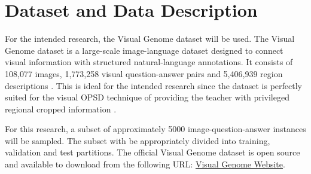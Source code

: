 \section{Dataset and Data Description}

For the intended research, the Visual Genome dataset will be used. The Visual Genome
dataset is a large-scale image-language dataset designed to connect visual information with 
structured natural-language annotations. It consists of 108,077 images, 1,773,258 visual question-answer pairs and
5,406,939 region descriptions \parencite{krishna2017visual}. This is ideal for the intended research since the dataset is perfectly
suited for the visual OPSD technique of providing the teacher with privileged regional cropped information \parencite{yuan2026vision}.

For this research, a subset of approximately 5000 image-question-answer instances will be sampled. The subset with be appropriately divided
into training, validation and test partitions. The official Visual Genome dataset is open source and available 
to download from the following URL: \href{https://homes.cs.washington.edu/~ranjay/visualgenome/index.html}{Visual Genome Website}.